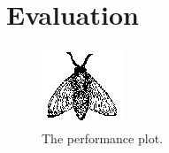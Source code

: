 \section{Evaluation}
\label{sec:evaluation}

\lipsum[1]

\begin{figure}
	\centering
	\includegraphics{./fig/fly}
	\caption{The performance plot.}
\end{figure}

\lipsum[1]
